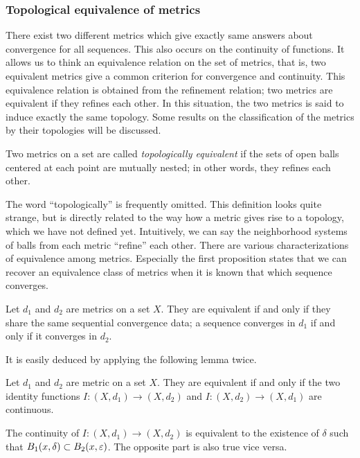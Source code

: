 \subsubsection{Topological equivalence of metrics}

There exist two different metrics which give exactly same answers about convergence for all sequences.
This also occurs on the continuity of functions.
It allows us to think an equivalence relation on the set of metrics, that is, two equivalent metrics give a common criterion for convergence and continuity.
This equivalence relation is obtained from the refinement relation; two metrics are equivalent if they refines each other.
In this situation, the two metrics is said to induce exactly the same topology.
Some results on the classification of the metrics by their topologies will be discussed.



\begin{defn}
Two metrics on a set are called \emph{topologically equivalent} if the sets of open balls centered at each point are mutually nested; in other words, they refines each other.
\end{defn}

The word ``topologically'' is frequently omitted.
This definition looks quite strange, but is directly related to the way how a metric gives rise to a topology, which we have not defined yet.
Intuitively, we can say the neighborhood systems of balls from each metric ``refine'' each other.
There are various characterizations of equivalence among metrics.
Especially the first proposition states that we can recover an equivalence class of metrics when it is known that which sequence converges.

\begin{prop}\label{prop:sequential convergence data}
Let $d_1$ and $d_2$ are metrics on a set $X$.
They are equivalent if and only if they share the same sequential convergence data; a sequence converges in $d_1$ if and only if it converges in $d_2$.
\end{prop}
\begin{pf}
It is easily deduced by applying the following lemma twice.
\end{pf}



\begin{prop}
Let $d_1$ and $d_2$ are metric on a set $X$.
They are equivalent if and only if the two identity functions $I:(X,d_1)\to(X,d_2)$ and $I:(X,d_2)\to(X,d_1)$ are continuous.
\end{prop}
\begin{pf}
The continuity of $I:(X,d_1)\to(X,d_2)$ is equivalent to the existence of $\delta$ such that $B_1(x,\delta)\subset B_2(x,\varepsilon)$.
The opposite part is also true vice versa.
\end{pf}

